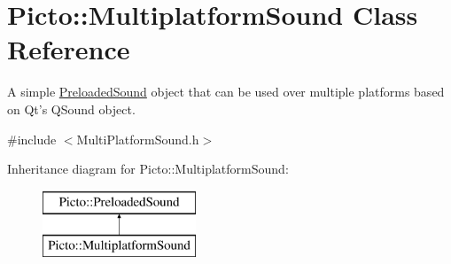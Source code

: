 \hypertarget{class_picto_1_1_multiplatform_sound}{\section{Picto\-:\-:Multiplatform\-Sound Class Reference}
\label{class_picto_1_1_multiplatform_sound}
}


A simple \hyperlink{class_picto_1_1_preloaded_sound}{Preloaded\-Sound} object that can be used over multiple platforms based on Qt's Q\-Sound object.  




{\ttfamily \#include $<$Multi\-Platform\-Sound.\-h$>$}

Inheritance diagram for Picto\-:\-:Multiplatform\-Sound\-:\begin{figure}[H]
\begin{center}
\leavevmode
\includegraphics[height=2.000000cm]{class_picto_1_1_multiplatform_sound}
\end{center}
\end{figure}
